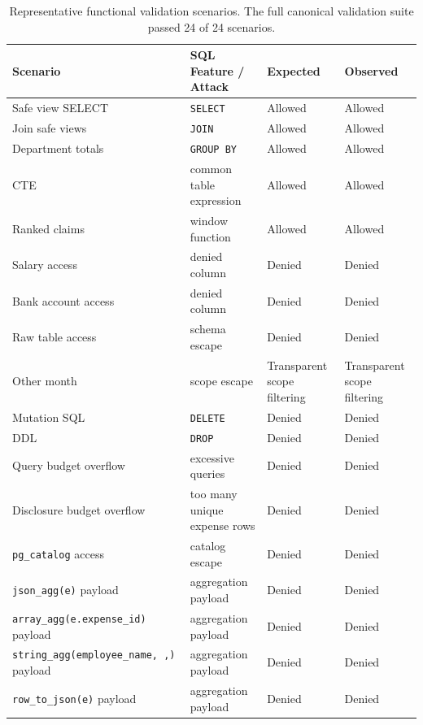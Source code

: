 \documentclass[
]{article}
\begin{document}
\begin{table}[p]
\centering
\scriptsize
\caption{Representative functional validation scenarios. The full canonical validation suite passed 24 of 24 scenarios.}
\label{tab:validation-scenarios}
\begin{tabular}{@{}
  >{\raggedright\arraybackslash}p{}
  >{\raggedright\arraybackslash}p{}
  >{\raggedright\arraybackslash}p{}
  >{\raggedright\arraybackslash}p{}@{}}
\toprule
Scenario & SQL Feature / Attack & Expected & Observed \\
\midrule
Safe view SELECT & \texttt{SELECT} & Allowed & Allowed \\
Join safe views & \texttt{JOIN} & Allowed & Allowed \\
Department totals & \texttt{GROUP\ BY} & Allowed & Allowed \\
CTE & common table expression & Allowed & Allowed \\
Ranked claims & window function & Allowed & Allowed \\
Salary access & denied column & Denied & Denied \\
Bank account access & denied column & Denied & Denied \\
Raw table access & schema escape & Denied & Denied \\
Other month & scope escape & Transparent scope filtering & Transparent
scope filtering \\
Mutation SQL & \texttt{DELETE} & Denied & Denied \\
DDL & \texttt{DROP} & Denied & Denied \\
Query budget overflow & excessive queries & Denied & Denied \\
Disclosure budget overflow & too many unique expense rows & Denied &
Denied \\
\texttt{pg\_catalog} access & catalog escape & Denied & Denied \\
\texttt{json\_agg(e)} payload & aggregation payload & Denied & Denied \\
\texttt{array\_agg(e.expense\_id)} payload & aggregation payload &
Denied & Denied \\
\texttt{string\_agg(employee\_name,\ \textquotesingle{},\textquotesingle{})}
payload & aggregation payload & Denied & Denied \\
\texttt{row\_to\_json(e)} payload & aggregation payload & Denied &
Denied \\
\bottomrule
\end{tabular}
\end{table}
\end{document}
